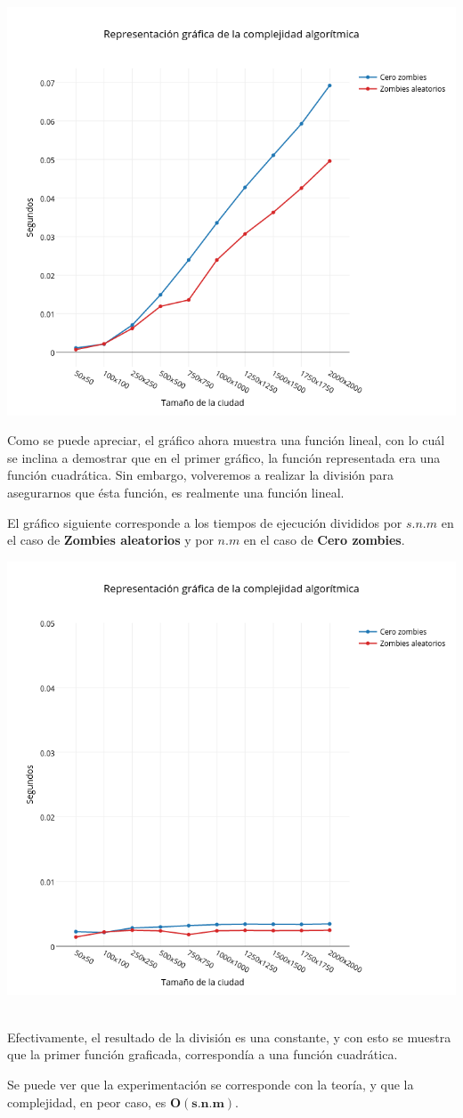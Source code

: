 \includegraphics[width=15cm,keepaspectratio=yes]{imagenes/ej2/linealizacion.png}

Como se puede apreciar, el gráfico ahora muestra una función lineal, con lo cuál se inclina a demostrar que en el primer gráfico, la función representada era una función cuadrática.
Sin embargo, volveremos a realizar la división para asegurarnos que ésta función, es realmente una función lineal.

\newpage

El gr\'afico siguiente corresponde a los tiempos de ejecuci\'on divididos por $s.n.m$ en el caso de \textbf{Zombies aleatorios}  y por $n.m$ en el caso de \textbf{Cero zombies}.

\includegraphics[width=15cm,keepaspectratio=yes]{imagenes/ej2/constantizacion.png}\

Efectivamente, el resultado de la división es una constante, y con esto se muestra que la primer función graficada, correspondía a una función cuadrática.

\bigskip

Se puede ver que la experimentación se corresponde con la teoría, y que la complejidad, en peor caso, es $\mathbf{O(s.n.m)}$.

